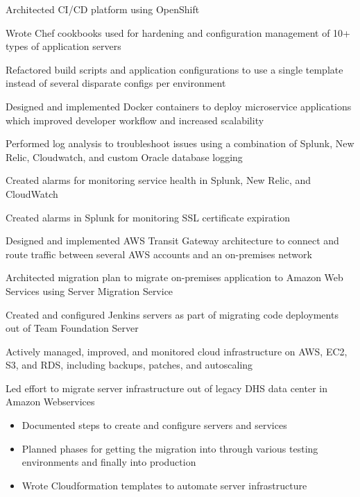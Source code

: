 \begin{cventries}
{\begin{cvitems}
        \item {Architected CI/CD platform using OpenShift}
        \item {Wrote Chef cookbooks used for hardening and configuration management of 10+ types of application servers}
        \item {Refactored build scripts and application configurations to use a single template instead of several disparate configs per environment}
        \item {Designed and implemented Docker containers to deploy microservice applications which improved developer workflow and increased scalability}
        \item {Performed log analysis to troubleshoot issues using a combination of Splunk, New Relic, Cloudwatch, and custom Oracle database logging}
        \item {Created alarms for monitoring service health in Splunk, New Relic, and CloudWatch}
        \item {Created alarms in Splunk for monitoring SSL certificate expiration}
        \item {Designed and implemented AWS Transit Gateway architecture to connect and route traffic between several AWS accounts and an on-premises network}
        \item {Architected migration plan to migrate on-premises application to Amazon Web Services using Server Migration Service}
        \item {Created and configured Jenkins servers as part of migrating code deployments out of Team Foundation Server}
        \item {Actively managed, improved, and monitored cloud infrastructure on AWS, EC2, S3, and RDS, including backups, patches, and autoscaling}
        \item {Led effort to migrate server infrastructure out of legacy DHS data center in Amazon Webservices}
        \begin{itemize}
          \item {Documented steps to create and configure servers and services}
          \item {Planned phases for getting the migration into through various testing environments and finally into production}
          \item {Wrote Cloudformation templates to automate server infrastructure}

\end{itemize}
\end{cvitems}}
\end{cventries}
